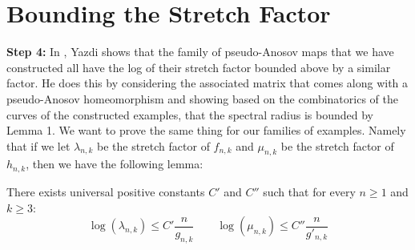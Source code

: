 \section{Bounding the Stretch Factor}

\textbf{Step 4:} In \cite{yazdi2018pseudo}, Yazdi shows that the family of pseudo-Anosov maps that we have constructed all have the log of their stretch factor bounded above by a similar factor. He does this by considering the associated matrix that comes along with a pseudo-Anosov homeomorphism and showing based on the combinatorics of the curves of the constructed examples, that the spectral radius is bounded by Lemma 1. We want to prove the same thing for our families of examples. Namely that if we let $\lambda_{n,k}$ be the stretch factor of $f_{n,k}$ and $\mu_{n,k}$ be the stretch factor of $h_{n,k}$, then we have the following lemma: 
\begin{lem}
There exists universal positive constants $C'$ and $C''$ such that for every $n \geq 1$ and $k \geq 3$:
$$\log(\lambda_{n,k}) \leq C'\frac{n}{g_{n,k}} \hspace{2em} \log(\mu_{n,k}) \leq C''\frac{n}{g'_{n,k}}$$
\end{lem}
